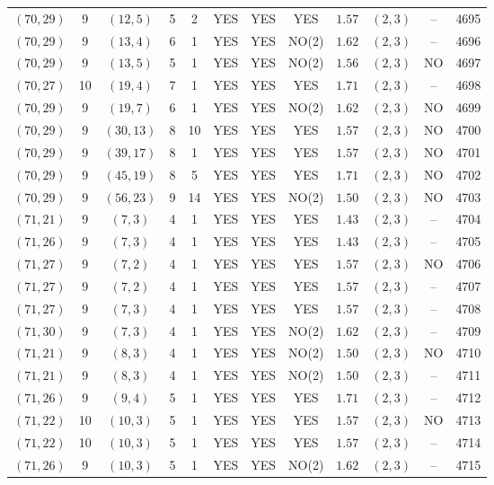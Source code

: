\begin{longtable}{|c|c|c|c|c|c|c|c|c|c|c|c|}
$(70,29)$ & 9 & $(12,5)$ & 5 & 2 & YES & YES & YES & $1.57$ & $(2,3)$ & -- & 4695\\
$(70,29)$ & 9 & $(13,4)$ & 6 & 1 & YES & YES & NO(2) & $1.62$ & $(2,3)$ & -- & 4696\\
$(70,29)$ & 9 & $(13,5)$ & 5 & 1 & YES & YES & NO(2) & $1.56$ & $(2,3)$ & NO & 4697\\
$(70,27)$ & 10 & $(19,4)$ & 7 & 1 & YES & YES & YES & $1.71$ & $(2,3)$ & -- & 4698\\
$(70,29)$ & 9 & $(19,7)$ & 6 & 1 & YES & YES & NO(2) & $1.62$ & $(2,3)$ & NO & 4699\\
$(70,29)$ & 9 & $(30,13)$ & 8 & 10 & YES & YES & YES & $1.57$ & $(2,3)$ & NO & 4700\\
$(70,29)$ & 9 & $(39,17)$ & 8 & 1 & YES & YES & YES & $1.57$ & $(2,3)$ & NO & 4701\\
$(70,29)$ & 9 & $(45,19)$ & 8 & 5 & YES & YES & YES & $1.71$ & $(2,3)$ & NO & 4702\\
$(70,29)$ & 9 & $(56,23)$ & 9 & 14 & YES & YES & NO(2) & $1.50$ & $(2,3)$ & NO & 4703\\
$(71,21)$ & 9 & $(7,3)$ & 4 & 1 & YES & YES & YES & $1.43$ & $(2,3)$ & -- & 4704\\
$(71,26)$ & 9 & $(7,3)$ & 4 & 1 & YES & YES & YES & $1.43$ & $(2,3)$ & -- & 4705\\
$(71,27)$ & 9 & $(7,2)$ & 4 & 1 & YES & YES & YES & $1.57$ & $(2,3)$ & NO & 4706\\
$(71,27)$ & 9 & $(7,2)$ & 4 & 1 & YES & YES & YES & $1.57$ & $(2,3)$ & -- & 4707\\
$(71,27)$ & 9 & $(7,3)$ & 4 & 1 & YES & YES & YES & $1.57$ & $(2,3)$ & -- & 4708\\
$(71,30)$ & 9 & $(7,3)$ & 4 & 1 & YES & YES & NO(2) & $1.62$ & $(2,3)$ & -- & 4709\\
$(71,21)$ & 9 & $(8,3)$ & 4 & 1 & YES & YES & NO(2) & $1.50$ & $(2,3)$ & NO & 4710\\
$(71,21)$ & 9 & $(8,3)$ & 4 & 1 & YES & YES & NO(2) & $1.50$ & $(2,3)$ & -- & 4711\\
$(71,26)$ & 9 & $(9,4)$ & 5 & 1 & YES & YES & YES & $1.71$ & $(2,3)$ & -- & 4712\\
$(71,22)$ & 10 & $(10,3)$ & 5 & 1 & YES & YES & YES & $1.57$ & $(2,3)$ & NO & 4713\\
$(71,22)$ & 10 & $(10,3)$ & 5 & 1 & YES & YES & YES & $1.57$ & $(2,3)$ & -- & 4714\\
$(71,26)$ & 9 & $(10,3)$ & 5 & 1 & YES & YES & NO(2) & $1.62$ & $(2,3)$ & -- & 4715\\

\end{longtable}

